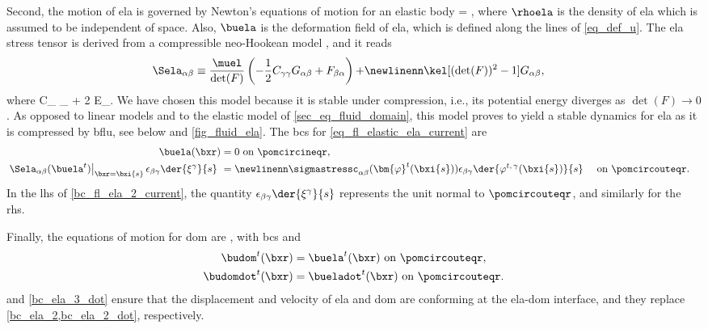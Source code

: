 Second,  the motion of \ac{ela} is governed by Newton's equations of motion for an elastic body \cite{landauTheoryElasticity1986}
\be\label{eq_fl_elastic_ela_current}
\rhoela {} = \pderr{\Sela_{\alpha \beta}(\buela)}{\beta},
\ee
where  $\rhoela$ is the density  of \ac{ela} which is assumed to be independent of space.
Also, $\buela$ is the deformation field of \ac{ela}, which is defined along the lines of \cref{eq_def_u}.
The \ac{ela} stress tensor is derived from a compressible neo-Hookean model \cite{bazilevsIsogeometricFluidstructureInteraction2008}, and it reads
\begin{align}
        \label{eq_def_S_neo_hookean}
        \Sela_{\alpha \beta} \equiv \frac{\muel}{\det(F)}\left(- \frac{1}{2} C_{\gamma \gamma} G_{\alpha \beta} + F_{\beta \alpha}\right) + & \newlinenn
        \kel [(\det(F))^2-1] G_{\alpha \beta},
\end{align}
where
\be
\label{eq_def_C}
C_{\alpha \beta } \equiv \delta_{\alpha \beta} + 2 E_{\alpha \beta}.
\ee
We have chosen this model because it is stable under compression, i.e., its potential energy diverges as $\det(F) \rightarrow 0$ \cite{bazilevsIsogeometricFluidstructureInteraction2008}. As opposed to linear models \cite{landauTheoryElasticity1986} and to the elastic model of  \cref{sec_eq_fluid_domain}, this model  proves to yield a stable dynamics for \ac{ela} as it is compressed  by  \ac{bflu}, see below and \cref{fig_fluid_ela}.
The \acp{bc} for \cref{eq_fl_elastic_ela_current} are
\begin{align}
        \label{bc_fl_ela_1_current}
        \buela(\bxr)                                                                                                              & =0               \text{ on }\pomcircineqr,   \\
        \label{bc_fl_ela_2_current}
        \left. \Sela_{\alpha \beta}(\buela^t)\right|_{\bxr = \bxi{s}} \epsilon_{\beta \gamma} \der{\xi^\gamma}{s}\                & =    \newlinenn
        \sigmastressc_{\alpha \beta}(\bm{\varphi}^t(\bxi{s})) \epsilon_{\beta \gamma} \der{{\varphi}^{t, \, \gamma} (\bxi{s})}{s} & \text{ on } \pomcircouteqr.                &
\end{align}
In the \ac{lhs} of \cref{bc_fl_ela_2_current}, the quantity $\epsilon_{\beta \gamma} \der{\xi^\gamma}{s}$ represents the unit normal to $\pomcircouteqr$, and similarly for the \ac{rhs}.


Finally, the equations of motion for \ac{dom} are , with \acp{bc}  and
\begin{align}
        \label{bc_ela_3}
        \budom^t(\bxr)    & = \buela^t(\bxr) \text{ on } \pomcircouteqr,    \\
        \label{bc_ela_3_dot}
        \budomdot^t(\bxr) & = \bueladot^t(\bxr) \text{ on } \pomcircouteqr.
\end{align}
 and \cref{bc_ela_3_dot} ensure that the displacement and velocity of \ac{ela} and  \ac{dom} are conforming at the \ac{ela}-\ac{dom} interface, and they replace  \cref{bc_ela_2,bc_ela_2_dot}, respectively.



